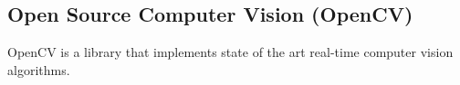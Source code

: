 








	\subsection{Open Source Computer Vision (OpenCV)}
	\label{opencv}

	OpenCV\cite{opencv} is a library that implements state of the art real-time computer vision 
	algorithms. 

